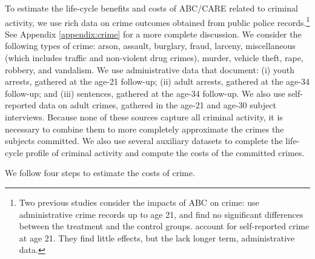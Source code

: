 To estimate the life-cycle benefits and costs of ABC/CARE related to criminal activity, we use rich data on crime outcomes obtained from public police records.\footnote{Two previous studies consider the impacts of ABC on crime: \citet{Clarke_Campbell_1998_ABC_Comparison_ECRQ} use administrative crime records up to age 21, and find no significant differences between the treatment and the control groups. \cite{Barnett_Masse_2002_benefitcost,Barnett_Masse_2007_EER} account for self-reported crime at age 21. They find little effects, but the lack longer term, administrative data.} See Appendix \ref{appendix:crime} for a more complete discussion. We consider the following types of crime: arson, assault, burglary, fraud, larceny, miscellaneous (which includes traffic and non-violent drug crimes), murder, vehicle theft, rape, robbery, and vandalism. We use administrative data that document: (i) youth arrests, gathered at the age-21 follow-up; (ii) adult arrests, gathered at the age-34 follow-up; and (iii) sentences, gathered at the age-34 follow-up. We also use self-reported data on adult crimes, gathered in the age-21 and age-30 subject interviews. Because none of these sources capture all criminal activity, it is necessary to combine them to more completely approximate the crimes the subjects committed. We also use several auxiliary datasets to complete the life-cycle profile of criminal activity and compute the costs of the committed crimes.

We follow four steps to estimate the costs of crime.

